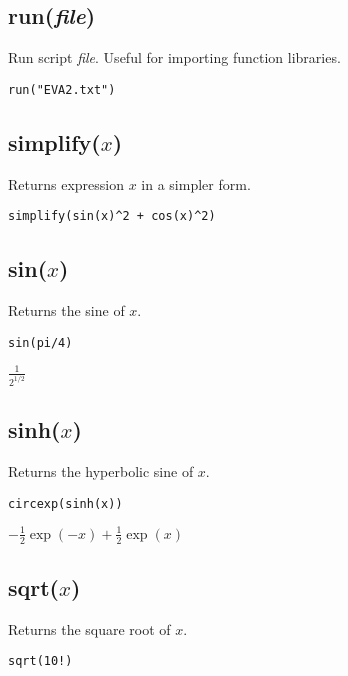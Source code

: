 \subsection*{run({\it file})}

Run script {\it file}.
Useful for importing function libraries.

{\color{blue}
\begin{verbatim}
run("EVA2.txt")
\end{verbatim}
}

\subsection*{simplify($x$)}

Returns expression $x$ in a simpler form.

{\color{blue}
\begin{verbatim}
simplify(sin(x)^2 + cos(x)^2)
\end{verbatim}
}


\subsection*{sin($x$)}

Returns the sine of $x$.

{\color{blue}
\begin{verbatim}
sin(pi/4)
\end{verbatim}
}

\noindent
$\displaystyle \frac{1}{2^{1/2}}$

\subsection*{sinh($x$)}

Returns the hyperbolic sine of $x$.

{\color{blue}
\begin{verbatim}
circexp(sinh(x))
\end{verbatim}
}

\noindent
$\displaystyle -\tfrac{1}{2}\exp(-x)+\tfrac{1}{2}\exp(x)$

\subsection*{sqrt($x$)}

Returns the square root of $x$.

{\color{blue}
\begin{verbatim}
sqrt(10!)
\end{verbatim}
}

